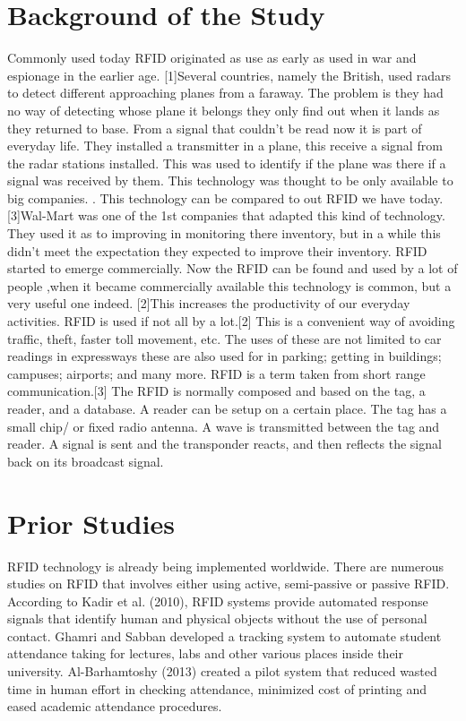 \section{Background of the Study}

	Commonly used today RFID originated as use as early as used in war and espionage in the earlier age. [1]Several countries, namely the British, used radars to detect different approaching planes from a faraway. The problem is they had no way of detecting whose plane it belongs they only find out when it lands as they returned to base. From a signal that couldn’t be read now it is part of everyday life. They installed a transmitter in a plane, this receive a signal from the radar stations installed. This was used to identify if the plane was there if a signal was received by them. This technology was thought to be only available to big companies. . This technology can be compared to out RFID we have today. [3]Wal-Mart was one of the 1st companies that adapted this kind of technology. They used it as to improving in monitoring there inventory, but in a while this didn’t meet the expectation they expected to improve their inventory. RFID started to emerge commercially. Now the RFID can be found and used by a lot of people ,when it became commercially available this technology is common, but a very useful one indeed. 
[2]This increases the productivity of our everyday activities. RFID is used if not all by a lot.[2] This is a convenient way of avoiding traffic, theft, faster toll movement, etc. The uses of these are not limited to car readings in expressways these are also used for in parking; getting in buildings; campuses; airports; and many more. RFID is a term taken from short range communication.[3] The RFID is normally composed and based on the tag, a reader, and a database. A reader can be setup on a certain place. The tag has a small chip/ or fixed radio antenna. A wave is transmitted between the tag and reader. A signal is sent and the transponder reacts, and then reflects the signal back on its broadcast signal.

\section{Prior Studies}
RFID technology is already being implemented worldwide. There are numerous studies on RFID that involves either using active, semi-passive or passive RFID. According to Kadir et al. (2010), RFID systems provide automated response signals that identify human and physical objects without the use of personal contact. Ghamri and Sabban developed a tracking system to automate student attendance taking for lectures, labs and other various places inside their university. Al-Barhamtoshy (2013) created a pilot system that reduced wasted time in human effort in checking attendance, minimized cost of printing and eased academic attendance procedures.

